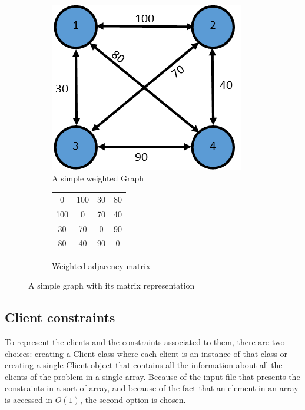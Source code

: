 \begin{figure}
	\centering
		\begin{subfigure}[b]{0.3\textwidth}
			\includegraphics[width=\textwidth]{images/graph1.png}
			\caption{A simple weighted Graph}
		\end{subfigure}
		\qquad
		\begin{subfigure}[b]{0.3\textwidth}
			\begin{tabular}{cccc}
				0 & 100 & 30 & 80\\
				100 & 0 & 70 & 40 \\
				30 & 70 & 0 & 90 \\
				80 & 40 & 90 & 0 \\
			\end{tabular}
			\caption{Weighted adjacency matrix}
		\end{subfigure}
	\caption{A simple graph with its matrix representation}
	\label{fig:adjacencymatrix}
\end{figure}

\subsection{Client constraints}
	To represent the clients and the constraints associated to them, there are two choices: creating a Client class where each client is an instance of that class or creating a single Client object that contains all the information about all the clients of the problem in a single array. Because of the input file that presents the constraints in a sort of array, and because of the fact that an element in an array is accessed in $O(1)$, the second option is chosen.
		
